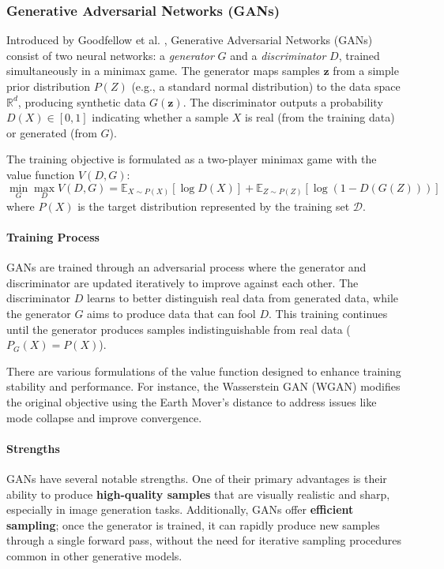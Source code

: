 \subsubsection{Generative Adversarial Networks (GANs)}

Introduced by Goodfellow et al. \cite{goodfellow2014generative}, Generative Adversarial Networks (GANs) consist of two neural networks: a \textit{generator} \( G \) and a \textit{discriminator} \( D \), trained simultaneously in a minimax game. The generator maps samples \( \mathbf{z} \) from a simple prior distribution \( P(Z) \) (e.g., a standard normal distribution) to the data space \( \mathbb{R}^d \), producing synthetic data \( G(\mathbf{z}) \). The discriminator outputs a probability \( D(X) \in [0,1] \) indicating whether a sample \( X \) is real (from the training data) or generated (from \( G \)).

The training objective is formulated as a two-player minimax game with the value function \( V(D, G) \):
\[
\min_{G} \max_{D} V(D, G) = \mathbb{E}_{X \sim P(X)} [\log D(X)] + \mathbb{E}_{Z \sim P(Z)} [\log (1 - D(G(Z)))]
\]
where \( P(X) \) is the target distribution represented by the training set \( \mathcal{D} \).

\paragraph{Training Process} 

GANs are trained through an adversarial process where the generator and discriminator are updated iteratively to improve against each other. The discriminator \( D \) learns to better distinguish real data from generated data, while the generator \( G \) aims to produce data that can fool \( D \). This training continues until the generator produces samples indistinguishable from real data (\( P_G(X) = P(X) \)).

There are various formulations of the value function designed to enhance training stability and performance. For instance, the Wasserstein GAN (WGAN) \cite{arjovsky2017wasserstein} modifies the original objective using the Earth Mover's distance to address issues like mode collapse and improve convergence.

\paragraph{Strengths} 

GANs have several notable strengths. One of their primary advantages is their ability to produce \textbf{high-quality samples} that are visually realistic and sharp, especially in image generation tasks. Additionally, GANs offer \textbf{efficient sampling}; once the generator is trained, it can rapidly produce new samples through a single forward pass, without the need for iterative sampling procedures common in other generative models.


